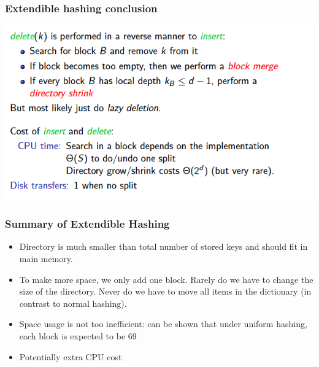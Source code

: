 \documentclass{article}
\begin{document}
\subsubsection*{Extendible hashing conclusion}
\begin{center}
\includegraphics[scale=0.7]{6}
\end{center}

\subsubsection*{Summary of Extendible Hashing}
\begin{itemize}
\item Directory is much smaller than total number of stored keys and
should fit in main memory.
\item To make more space, we only add one block.
Rarely do we have to change the size of the directory.
Never do we have to move all items in the dictionary
(in contrast to normal hashing).
\item Space usage is not too inefficient: can be shown that
under uniform hashing, each block is expected to be 69%
\item Potentially extra CPU cost
\end{itemize}
\end{document}
